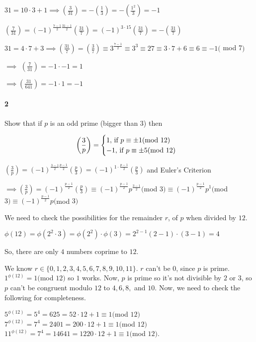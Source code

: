 \documentclass{article}
\begin{document}
$31 = 10\cdot 3 + 1 \implies (\frac{3}{31}) = - (\frac{1}{3}) =
-(\frac{1^2}{3})=
-1 $

$(\frac{7}{31})  = (-1)^{\frac{7-1}{2}\frac{31-1}{2}}(\frac{31}{7}) =
(-1)^{3\cdot 15} (\frac{31}{7}) = -(\frac{31}{7})$

$31 = 4\cdot 7 + 3 \implies (\frac{31}{7}) = (\frac{3}{7}) \equiv
3^{\frac{7-1}{2}} \equiv 3^{3} \equiv 27 \equiv 3\cdot 7 + 6 \equiv 6
\equiv -1 ($ mod 7$)$

$\implies$
$(\frac{7}{31})  = -1\cdot -1 =1$

$\implies (\frac{31}{641}) = -1\cdot 1 = -1 $


\newpage
\paragraph{2} Show that if $p$ is an odd prime (bigger than $3$) then

\[\left(\frac{3}{p}\right) = \begin{cases} 1, $ if $ p\equiv \pm 1
    ($mod $ 12)\\ -1, $ if $ p\equiv \pm 5
    ($mod $ 12)
  \end{cases}\]

\vspace{0.618 em}

$\left(\frac{3}{p}\right) =
(-1)^{\frac{3-1}{2}\frac{p-1}{2}}\left(\frac{p}{3}\right)=
(-1)^{1\cdot \frac{p-1}{2}}\left(\frac{p}{3}\right)$
and Euler's Criterion

$\implies \left(\frac{3}{p}\right) =
(-1)^{\frac{p-1}{2}}\left(\frac{p}{3}\right) \equiv
(-1)^{\frac{p-1}{2}}p^{\frac{3-1}{2}} ($mod $3)\equiv
(-1)^{\frac{p-1}{2}}p^{1} ($mod $3)\equiv
(-1)^{\frac{p-1}{2}} p ($mod $3)$

We need to check the possibilities for the remainder
$r$, of $p$ when divided by $12$.

$\phi(12) = \phi(2^2\cdot 3) = \phi(2^2)\cdot \phi(3) =2^{2-1}(2-1)\cdot (3-1) = 4$

So, there are only $4$ numbers coprime to $12$.

We know $r \in \{0,1,2,3,4,5,6,7,8,9,10,11\}$. $r$ can't be $0$, since
$p$ is prime. $1^{\phi(12)}= 1 ($mod $12)$ so $1$ works. Now, $p$ is
prime so it's not divisible by $2$ or $3$, so $p$ can't be congruent
modulo $12$ to $4,6,8,$ and $10$. Now, we need to check the following
for completeness.

$5^{\phi(12)}= 5^4 = 625 = 52\cdot 12 + 1 \equiv 1 ($mod $12)$\\
$7^{\phi(12)}= 7^4 = 2401 = 200\cdot 12 + 1 \equiv 1 ($mod $12)$\\
$11^{\phi(12)}= 7^4 = 14641 = 1220\cdot 12 + 1 \equiv 1 ($mod $12)$.
\end{document}

